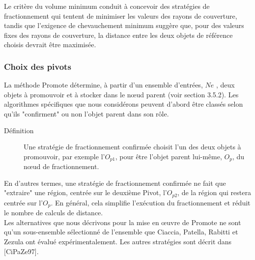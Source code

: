 Le critère du volume minimum conduit à concevoir des stratégies de fractionnement qui tentent de minimiser les valeurs des rayons de couverture, tandis que l'exigence de chevauchement minimum suggère que, pour des valeurs fixes des rayons de couverture, la distance entre les deux objets de référence choisis devrait être maximisée.

\subsubsection{Choix des pivots}
La méthode Promote détermine, à partir d'un ensemble d'entrées, $ Ne $ , deux objets à promouvoir et à stocker dans le nœud parent (voir section 3.5.2). Les algorithmes spécifiques que nous considérons peuvent d'abord être classés selon qu'ils "confirment" ou non l'objet parent dans son rôle.

\begin{description}
	\item[Définition]  Une stratégie de fractionnement confirmée choisit l'un des deux objets à promouvoir, par exemple l'$ O_{p1} $, pour être l'objet parent lui-même, $ O_p $, du nœud de fractionnement.
\end{description}

En d'autres termes, une stratégie de fractionnement confirmée ne fait que "extraire" une région, centrée sur le deuxième Pivot, l'$ O_{p2} $, de la région qui restera centrée sur l'$ O_p $. En général, cela simplifie l'exécution du fractionnement et réduit le nombre de calculs de distance.\\

Les alternatives que nous décrivons pour la mise en œuvre de Promote ne sont qu'un sous-ensemble sélectionné de l'ensemble que Ciaccia, Patella, Rabitti et Zezula ont évalué expérimentalement. Les autres stratégies sont décrit dans [CiPaZe97].

